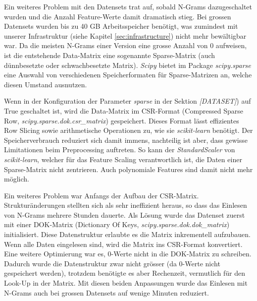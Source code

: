 \documentclass[10pt, a4paper]{article}
\begin{document}
Ein weiteres Problem mit den Datensets trat auf, sobald N-Grams dazugeschaltet wurden und die Anzahl Feature-Werte damit dramatisch stieg. Bei grossen Datensets wurden bis zu 40 GB Arbeitsspeicher benötigt, was zumindest mit unserer Infrastruktur (siehe Kapitel \ref{sec:infrastructure}) nicht mehr bewältigbar war. Da die meisten N-Grams einer Version eine grosse Anzahl von 0 aufweisen, ist die entstehende Data-Matrix eine sogenannte Sparse-Matrix (auch dünnbesetzte oder schwachbesetzte Matrix). \emph{Scipy} bietet im Package \emph{scipy.sparse} eine Auswahl von verschiedenen Speicherformaten für Sparse-Matrizen an, welche diesen Umstand ausnutzen.

Wenn in der Konfiguration der Parameter \emph{sparse} in der Sektion \emph{[DATASET]}) auf True geschaltet ist, wird die Data-Matrix im CSR-Format (Compressed Sparse Row, \emph{scipy.sparse.dok.csr\_matrix}) gespeichert. Dieses Format lässt effizientes Row Slicing sowie arithmetische Operationen zu, wie sie \emph{scikit-learn} benötigt. Der Speicherverbrauch reduziert sich damit immens, nachteilig ist aber, dass gewisse Limitationen beim Preprocessing auftreten. So kann der \emph{StandardScaler} von \emph{scikit-learn}, welcher für das Feature Scaling verantwortlich ist, die Daten einer Sparse-Matrix nicht zentrieren. Auch polynomiale Features sind damit nicht mehr möglich.

Ein weiteres Problem war Anfangs der Aufbau der CSR-Matrix. Strukturänderungen stellten sich als sehr ineffizient heraus, so dass das Einlesen von N-Grams mehrere Stunden dauerte. Als Lösung wurde das Datenset zuerst mit einer DOK-Matrix (Dictionary Of Keys, \emph{scipy.sparse.dok.dok\_matrix}) initialisiert. Diese Datenstruktur erlaubte es die Matrix inkrementell aufzubauen. Wenn alle Daten eingelesen sind, wird die Matrix ins CSR-Format konvertiert. Eine weitere Optimierung war es, 0-Werte nicht in die DOK-Matrix zu schreiben. Dadurch wurde die Datenstruktur zwar nicht grösser (da 0-Werte nicht gespeichert werden), trotzdem benötigte es aber Rechenzeit, vermutlich für den Look-Up in der Matrix. Mit diesen beiden Anpassungen wurde das Einlesen mit N-Grams auch bei grossen Datensets auf wenige Minuten reduziert.

\end{document}
